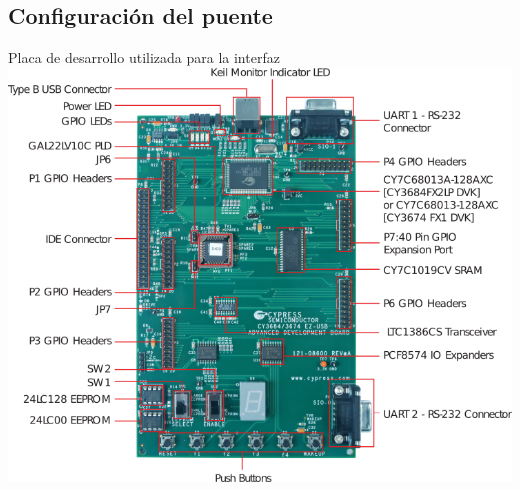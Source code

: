 \documentclass[11pt,a4paper]{beamer}
\begin{document}
		\subsection{Configuración del puente}
			\begin{frame}{Placa de desarrollo utilizada para la interfaz}
				\centering
				\includegraphics[height=0.8\textheight]{cy3684}
			\end{frame}
\end{document}
